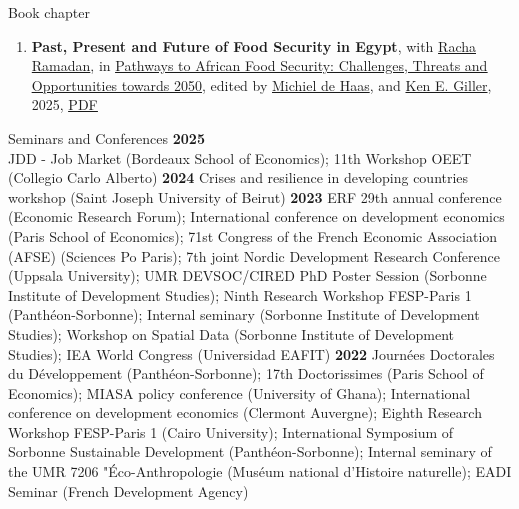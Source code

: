 \documentclass[
]{resume}
\begin{document}
\begin{small}
\begin{rSection}{Book chapter}
\begin{enumerate}
\item \textbf{Past, Present and Future of Food Security in Egypt}, with \href{https://scholar.google.com/citations?user=OH-yKZQAAAAJ&hl=en}{Racha Ramadan}, in \href{https://www.routledge.com/Pathways-to-African-Food-Security-Challenges-Threats-and-Opportunities-towards-2050/deHaas-Giller/p/book/9781032649658?srsltid=AfmBOoolqrs77yqzKgOg8RmFGkxwCn5Cr-c30_HqrrUXbVyoELnq1QJ5}{\uline{Pathways to African Food Security: Challenges, Threats and Opportunities towards 2050}}, edited by \href{https://scholar.google.com/citations?user=8jBsupsAAAAJ&hl=en}{Michiel de Haas}, and \href{https://scholar.google.com/citations?user=yct61VwAAAAJ&hl=fr}{Ken E. Giller}, 2025, \href{https://www.taylorfrancis.com/reader/download/f60b6d2e-a507-4c05-9a2f-cdde9916cbf5/chapter/pdf?context=ubx}{\uline{PDF}}
\end{enumerate}
\end{rSection}

\begin{rSection}{Seminars and Conferences}
\textbf{2025} \\ 
JDD - Job Market (Bordeaux School of Economics); 11th Workshop OEET (Collegio Carlo Alberto) \textbf{2024}
Crises and resilience in developing countries workshop (Saint Joseph University of Beirut) \textbf{2023} ERF 29th annual conference (Economic Research Forum); International conference on development economics (Paris School of Economics); 71st Congress of the French Economic Association (AFSE) (Sciences Po Paris); 7th joint Nordic Development Research Conference (Uppsala University); UMR DEVSOC/CIRED PhD Poster Session (Sorbonne Institute of Development Studies); Ninth Research Workshop FESP-Paris 1 (Panthéon-Sorbonne); Internal seminary (Sorbonne Institute of Development Studies); Workshop on Spatial Data (Sorbonne Institute of Development Studies); IEA World Congress (Universidad EAFIT) \textbf{2022} Journées Doctorales du Développement (Panthéon-Sorbonne); 17th Doctorissimes (Paris School of Economics); MIASA policy conference (University of Ghana); International conference on development economics (Clermont Auvergne); Eighth Research Workshop FESP-Paris 1 (Cairo University); International Symposium of Sorbonne Sustainable Development (Panthéon-Sorbonne); Internal seminary of the UMR 7206 "Éco-Anthropologie (Muséum national d’Histoire naturelle); EADI Seminar (French Development Agency)
\end{rSection}


\end{small}
\end{document}
